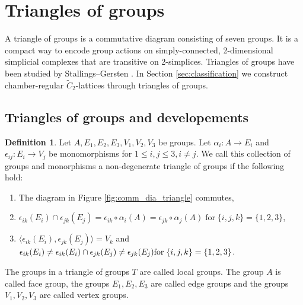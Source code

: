 \documentclass[dvipsnames]{article}
\theoremstyle{definition}
\newtheorem{definition}[theorem]{Definition}
\theoremstyle{remark}
\begin{document}
\section{Triangles of groups}\label{sec:triangles_of_groups}
    A triangle of groups is a commutative diagram consisting of seven groups. It is a compact way to encode group actions on simply-connected, 2-dimensional simplicial complexes that are transitive on 2-simplices. Triangles of groups have been studied by Stallings--Gersten \cite{StallingsGersten, Stallings}. In Section \ref{sec:classification} we construct chamber-regular $\tilde C_2$-lattices through triangles of groups. 

    \subsection{Triangles of groups and developements}
    
    \begin{definition}
    Let $A,E_1, E_2, E_3, V_1, V_2, V_3$ be groups. Let $\alpha_i : A \to E_i$ and $\epsilon_{ij} : E_i \to V_j$ be monomorphisms for $1\leq i, j \leq 3, i\neq j$. We call this collection of groups and monorphisms a non-degenerate triangle of groups if the following hold:
    \begin{enumerate}
        \item The diagram in Figure \ref{fig:comm_dia_triangle} commutes,
        \item $\epsilon_{ik}(E_i) \cap \epsilon_{jk}(E_j)=\epsilon_{ik}\circ\alpha_i(A)= \epsilon_{jk}\circ \alpha_j(A) \;\text{for}\; \{i,j, k\}=\{1, 2, 3\}$,
        \item $\langle \epsilon_{ik}(E_i), \epsilon_{jk}(E_j)\rangle = V_k $ and $ \epsilon_{ik}(E_i)
        \neq \epsilon_{ik}(E_i)\cap \epsilon_{jk}(E_j)\neq \epsilon_{jk}(E_j)\\\text{for}\; 
        \{i,j, k\}=\{1, 2, 3\}$.
    \end{enumerate}
    The groups in a triangle of groups $T$ are called local groups. The group $A$ is called face group, the groups $E_1, E_2, E_3$ are called edge groups and the groups $V_1, V_2, V_3$ are called vertex groups.
    \end{definition}
\end{document}
